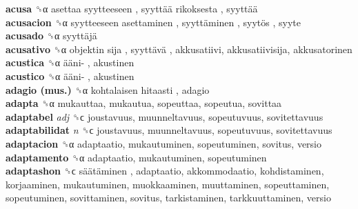 \textbf{acusa} ␝α   asettaa syytteeseen ,  syyttää rikoksesta ,  syyttää   \\
\textbf{acusacion} ␝α   syytteeseen asettaminen ,  syyttäminen ,  syytös , syyte  \\
\textbf{acusado} ␝α   syyttäjä   \\
\textbf{acusativo} ␝α   objektin sija ,  syyttävä , akkusatiivi, akkusatiivisija, akkusatorinen  \\
\textbf{acustica} ␝α   ääni- , akustinen  \\
\textbf{acustico} ␝α   ääni- , akustinen  \\
\textbf{adagio (mus.)} ␝α   kohtalaisen hitaasti , adagio  \\
\textbf{adapta} ␝α  mukauttaa, mukautua, sopeuttaa, sopeutua, sovittaa  \\
\textbf{adaptabel} \emph{adj}  ␝ϲ  joustavuus, muunneltavuus, sopeutuvuus, sovitettavuus  \\
\textbf{adaptabilidat} \emph{n}  ␝ϲ  joustavuus, muunneltavuus, sopeutuvuus, sovitettavuus  \\
\textbf{adaptacion} ␝α  adaptaatio, mukautuminen, sopeutuminen, sovitus, versio  \\
\textbf{adaptamento} ␝α  adaptaatio, mukautuminen, sopeutuminen  \\
\textbf{adaptashon} ␝ϲ   säätäminen , adaptaatio, akkommodaatio, kohdistaminen, korjaaminen, mukautuminen, muokkaaminen, muuttaminen, sopeuttaminen, sopeutuminen, sovittaminen, sovitus, tarkistaminen, tarkkuuttaminen, versio  \\
